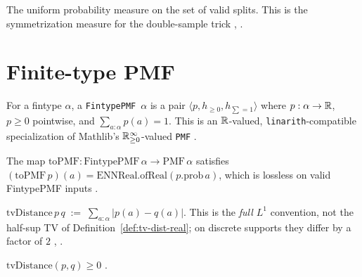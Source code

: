 \begin{defn}
\label{def:split-measure}
  \leanok
The uniform probability measure on the set of valid splits. This is
the symmetrization measure for the double-sample trick
\cite{vapnik1971}, \cite[Ch.~12]{boucheron2013concentration}.
\end{defn}

\section{Finite-type PMF}\label{sec:fintype-pmf}

\begin{defn}
\label{def:fintype-pmf}
  \leanok
For a fintype $\alpha$, a \texttt{FintypePMF}~$\alpha$ is a pair
$\langle p, h_{\ge 0}, h_{\sum = 1} \rangle$ where $p : \alpha \to \mathbb{R}$,
$p \ge 0$ pointwise, and $\sum_{a : \alpha} p(a) = 1$. This is an
$\mathbb{R}$-valued, \texttt{linarith}-compatible specialization of Mathlib's
$\mathbb{R}_{\ge 0}^\infty$-valued \texttt{PMF} \cite[\S4]{boucheron2013concentration}.
\end{defn}

\begin{thm}
\label{thm:fintype-pmf-bridge}
  \leanok
The map $\mathrm{toPMF} : \mathrm{FintypePMF}\,\alpha \to \mathrm{PMF}\,\alpha$
satisfies $(\mathrm{toPMF}\,p)(a) = \mathrm{ENNReal.ofReal}(p.\mathrm{prob}\,a)$,
which is lossless on valid FintypePMF inputs
\cite[\S4.1]{boucheron2013concentration}.
\end{thm}

\begin{defn}[$L^1$ TV distance]
\label{def:tv-distance-fintype}
  \leanok
$\mathrm{tvDistance}\,p\,q \;:=\; \sum_{a : \alpha} | p(a) - q(a) |$.
This is the \emph{full $L^1$} convention, not the half-sup TV of
Definition~\ref{def:tv-dist-real}; on discrete supports they differ
by a factor of $2$
\cite[\S4.1]{boucheron2013concentration}, \cite[Ch.~1]{villani2009}.
\end{defn}

\begin{thm}
\label{thm:tv-distance-nonneg}
  \leanok
$\mathrm{tvDistance}(p, q) \ge 0$
\cite[\S4.1]{boucheron2013concentration}.
\end{thm}

